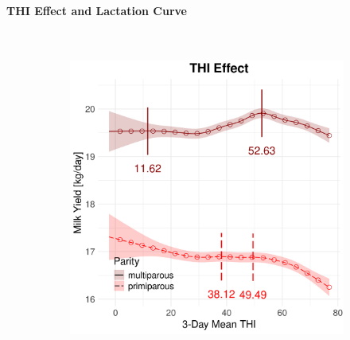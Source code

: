 \newpage
\paragraph{THI Effect and Lactation Curve} \quad \\
\begin{figure}[H]
    \centering
    \begin{subfigure}[b]{0.45\textwidth}
        \centering
        \includegraphics[width=\textwidth]{thesis/figures/models/milk/after2010/ob_milk_after2010/ob_milk_after2010_marginal_thi_milk_combined.png}
    \end{subfigure}
    \hspace{0.05\textwidth} %
    \begin{subfigure}[b]{0.45\textwidth}
        \centering

\end{subfigure}
\end{figure}
